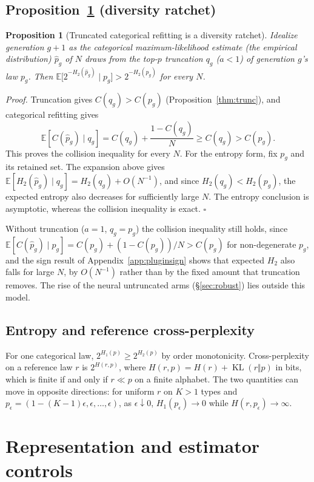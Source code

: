 \documentclass[10pt]{article}
\theoremstyle{plain}
\newtheorem{proposition}{Proposition}
\theoremstyle{definition}
\newcommand{\E}{\mathbb{E}}
\newcommand{\KL}{\operatorname{KL}}
\newcommand{\ph}{\hat p}
\newcommand{\Htwo}{H_2}
\begin{document}
\subsection{Proposition~\ref{prop:ratchet} (diversity ratchet)}
\begin{proposition}[Truncated categorical refitting is a diversity ratchet]
\label{prop:ratchet}
Idealize generation $g{+}1$ as the categorical maximum-likelihood estimate (the empirical distribution) $\ph_g$ of $N$ draws from the top-$p$ truncation $q_g$ ($a<1$) of generation $g$'s law $p_g$. Then $\E\big[2^{-\Htwo(\ph_g)}\mid p_g\big]>2^{-\Htwo(p_g)}$ for every $N$.
\end{proposition}
\emph{Proof.} Truncation gives $C(q_g)>C(p_g)$ (Proposition~\ref{thm:trunc}), and
categorical refitting gives
\[
\E[C(\ph_g)\mid q_g]=C(q_g)+\frac{1-C(q_g)}{N}\ge C(q_g)>C(p_g).
\]
This proves the collision inequality for every $N$. For the entropy form, fix $p_g$ and its
retained set. The expansion above gives $\E[\Htwo(\ph_g)\mid q_g]=\Htwo(q_g)+O(N^{-1})$, and since
$\Htwo(q_g)<\Htwo(p_g)$, the expected entropy also decreases for sufficiently large $N$. The
entropy conclusion is asymptotic, whereas the collision inequality is exact. $\square$

Without truncation ($a=1$, $q_g=p_g$) the collision inequality still holds, since
$\E[C(\ph_g)\mid p_g]=C(p_g)+(1-C(p_g))/N>C(p_g)$ for non-degenerate $p_g$, and the sign result of
Appendix~\ref{app:pluginsign} shows that expected $\Htwo$ also falls for large $N$, by $O(N^{-1})$
rather than by the fixed amount that truncation removes. The rise of the neural untruncated arms
(\S\ref{sec:robust}) lies outside this model.

\subsection{Entropy and reference cross-perplexity}
For one categorical law, $2^{H_1(p)}\ge2^{H_2(p)}$ by order monotonicity. Cross-perplexity on a
reference law $r$ is $2^{H(r,p)}$, where $H(r,p)=H(r)+\KL(r\Vert p)$ in bits, which is finite if
and only if $r\ll p$ on a finite alphabet. The two quantities can move in opposite directions: for
uniform $r$ on $K>1$ types and $p_\epsilon=(1-(K-1)\epsilon,\epsilon,\ldots,\epsilon)$, as
$\epsilon\downarrow0$, $H_1(p_\epsilon)\to0$ while $H(r,p_\epsilon)\to\infty$.

\section{Representation and estimator controls}
\label{app:controls}
\end{document}
